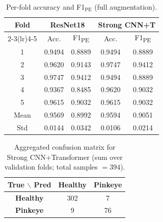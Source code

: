 \documentclass[preprint,12pt,authoryear]{elsarticle}
\begin{document}
\begin{table}
  \caption{Per-fold accuracy and F1$_{\mathrm{PE}}$ (full augmentation).}
  \label{tab:per_fold}
  \centering
  \begin{tabular}{ccccc}
    \toprule
    \multirow{2}{*}{\textbf{Fold}}
      & \multicolumn{2}{c}{\textbf{ResNet18}}
      & \multicolumn{2}{c}{\textbf{Strong CNN+T}} \\
    \cmidrule(lr){2-3}\cmidrule(lr){4-5}
      & Acc. & F1\textsubscript{PE}
      & Acc. & F1\textsubscript{PE} \\
    \midrule
    1 & 0.9494 & 0.8889 & 0.9494 & 0.8889 \\
    2 & 0.9620 & 0.9143 & 0.9747 & 0.9412 \\
    3 & 0.9747 & 0.9412 & 0.9494 & 0.8889 \\
    4 & 0.9367 & 0.8485 & 0.9620 & 0.9032 \\
    5 & 0.9615 & 0.9032 & 0.9615 & 0.9032 \\
    \midrule
    Mean & 0.9569 & 0.8992 & 0.9594 & 0.9051 \\
    Std  & 0.0144 & 0.0342 & 0.0106 & 0.0214 \\
    \bottomrule
  \end{tabular}
\end{table}

\begin{table}
  \caption{Aggregated confusion matrix for Strong CNN+Transformer (sum over validation folds; total samples $=394$).}
  \label{tab:confusion}
  \centering
  \begin{tabular}{ccc}
    \toprule
    \textbf{True $\backslash$ Pred}
      & \textbf{Healthy}
      & \textbf{Pinkeye} \\
    \midrule
    \textbf{Healthy}  & 302 & \phantom{0}7 \\
    \textbf{Pinkeye} & \phantom{0}9 & 76 \\
    \bottomrule
  \end{tabular}
\end{table}
\end{document}
